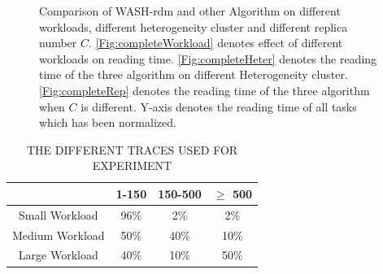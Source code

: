 \documentclass[conference]{IEEEtran}
\begin{document}
\begin{figure}[!t]
	\centering
	\quad\quad %
	\quad\quad
	\vspace{-1ex}
	\caption{Comparison of WASH-rdm and other Algorithm on different workloads, different heterogeneity cluster and different replica number $C$. \ref{Fig:completeWorkload} denotes effect of different workloads on reading time. \ref{Fig:completeHeter} denotes the reading time of the three algorithm on different Heterogeneity cluster. \ref{Fig:completeRep} denotes the reading time of the three algorithm when $C$ is different. Y-axis denotes the reading time of all tasks which has been normalized.}
	\label{Fig:complete}
	\vspace{-3ex}
\end{figure}
\begin{table}[htbp]
	\caption{THE DIFFERENT TRACES USED FOR EXPERIMENT}
	\begin{center}
		\begin{tabular}{|c|c|c|c|}
			\hline
			 \diagbox{Traces}{Number of tasks} & 1-150 & 150-500 & $\ge$ 500\\
			\hline
			Small Workload & 96\% & 2\% & 2\%\\
			\hline
			Medium Workload & 50\% & 40\% & 10\%\\
			\hline
			Large Workload & 40\% & 10\% & 50\%\\
			\hline
		\end{tabular}
		\label{tab:workload}
	\end{center}
\end{table}
\end{document}
